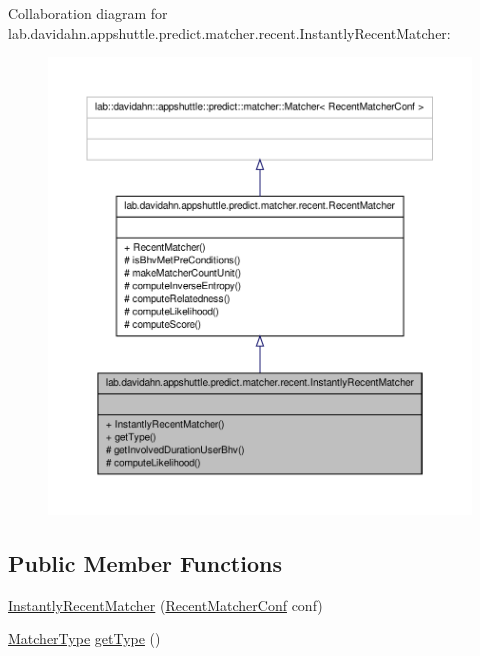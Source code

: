 \-Collaboration diagram for lab.\-davidahn.\-appshuttle.\-predict.\-matcher.\-recent.\-Instantly\-Recent\-Matcher\-:
\nopagebreak
\begin{figure}[H]
\begin{center}
\leavevmode
\includegraphics[width=350pt]{classlab_1_1davidahn_1_1appshuttle_1_1predict_1_1matcher_1_1recent_1_1_instantly_recent_matcher__coll__graph}
\end{center}
\end{figure}
\subsection*{\-Public \-Member \-Functions}
\begin{DoxyCompactItemize}
\item 
\hyperlink{classlab_1_1davidahn_1_1appshuttle_1_1predict_1_1matcher_1_1recent_1_1_instantly_recent_matcher_a194ada866d382a575747e1a08941a171}{\-Instantly\-Recent\-Matcher} (\hyperlink{classlab_1_1davidahn_1_1appshuttle_1_1predict_1_1matcher_1_1recent_1_1_recent_matcher_conf}{\-Recent\-Matcher\-Conf} conf)
\item 
\hyperlink{enumlab_1_1davidahn_1_1appshuttle_1_1predict_1_1matcher_1_1_matcher_type}{\-Matcher\-Type} \hyperlink{classlab_1_1davidahn_1_1appshuttle_1_1predict_1_1matcher_1_1recent_1_1_instantly_recent_matcher_a590d188fb5dd934b11d24e7023807fd2}{get\-Type} ()
\end{DoxyCompactItemize}
